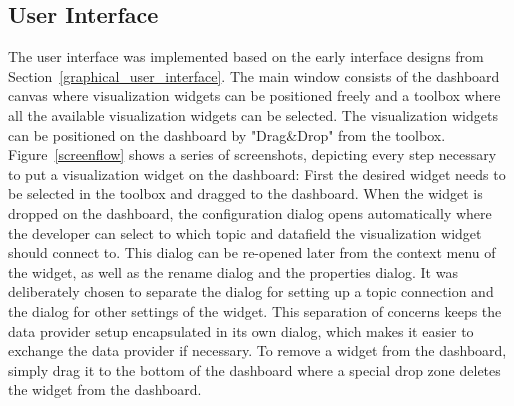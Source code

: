 \subsection{User Interface}
The user interface was implemented based on the early interface designs from Section~\ref{graphical_user_interface}. The main window consists of the dashboard canvas where visualization widgets can be positioned freely and a toolbox where all the available visualization widgets can be selected. The visualization widgets can be positioned on the dashboard by "Drag\&Drop" from the toolbox. Figure~\ref{screenflow} shows a series of screenshots, depicting every step necessary to put a visualization widget on the dashboard: First the desired widget needs to be selected in the toolbox and dragged to the dashboard. When the widget is dropped on the dashboard, the configuration dialog opens automatically where the developer can select to which topic and datafield the visualization widget should connect to. This dialog can be re-opened later from the context menu of the widget, as well as the rename dialog and the properties dialog. It was deliberately chosen to separate the dialog for setting up a topic connection and the dialog for other settings of the widget. This separation of concerns keeps the data provider setup encapsulated in its own dialog, which makes it easier to exchange the data provider if necessary. To remove a widget from the dashboard, simply drag it to the bottom of the dashboard where a special drop zone deletes the widget from the dashboard.

